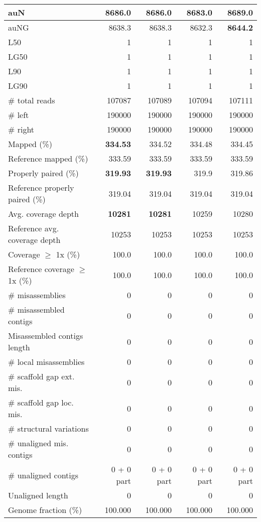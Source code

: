 \documentclass[12pt,a4paper]{article}
\begin{document}
\begin{table}[ht]
\begin{center}
\begin{tabular}{|l*{4}{|r}|}
auN & 8686.0 & 8686.0 & 8683.0 & {\bf 8689.0} \\ \hline
auNG & 8638.3 & 8638.3 & 8632.3 & {\bf 8644.2} \\ \hline
L50 & 1 & 1 & 1 & 1 \\ \hline
LG50 & 1 & 1 & 1 & 1 \\ \hline
L90 & 1 & 1 & 1 & 1 \\ \hline
LG90 & 1 & 1 & 1 & 1 \\ \hline
\# total reads & 107087 & 107089 & 107094 & 107111 \\ \hline
\# left & 190000 & 190000 & 190000 & 190000 \\ \hline
\# right & 190000 & 190000 & 190000 & 190000 \\ \hline
Mapped (\%) & {\bf 334.53} & 334.52 & 334.48 & 334.45 \\ \hline
Reference mapped (\%) & 333.59 & 333.59 & 333.59 & 333.59 \\ \hline
Properly paired (\%) & {\bf 319.93} & {\bf 319.93} & 319.9 & 319.86 \\ \hline
Reference properly paired (\%) & 319.04 & 319.04 & 319.04 & 319.04 \\ \hline
Avg. coverage depth & {\bf 10281} & {\bf 10281} & 10259 & 10280 \\ \hline
Reference avg. coverage depth & 10253 & 10253 & 10253 & 10253 \\ \hline
Coverage $\geq$ 1x (\%) & 100.0 & 100.0 & 100.0 & 100.0 \\ \hline
Reference coverage $\geq$ 1x (\%) & 100.0 & 100.0 & 100.0 & 100.0 \\ \hline
\# misassemblies & 0 & 0 & 0 & 0 \\ \hline
\# misassembled contigs & 0 & 0 & 0 & 0 \\ \hline
Misassembled contigs length & 0 & 0 & 0 & 0 \\ \hline
\# local misassemblies & 0 & 0 & 0 & 0 \\ \hline
\# scaffold gap ext. mis. & 0 & 0 & 0 & 0 \\ \hline
\# scaffold gap loc. mis. & 0 & 0 & 0 & 0 \\ \hline
\# structural variations & 0 & 0 & 0 & 0 \\ \hline
\# unaligned mis. contigs & 0 & 0 & 0 & 0 \\ \hline
\# unaligned contigs & 0 + 0 part & 0 + 0 part & 0 + 0 part & 0 + 0 part \\ \hline
Unaligned length & 0 & 0 & 0 & 0 \\ \hline
Genome fraction (\%) & 100.000 & 100.000 & 100.000 & 100.000 \\ \hline

\end{tabular}
\end{center}
\end{table}
\end{document}
